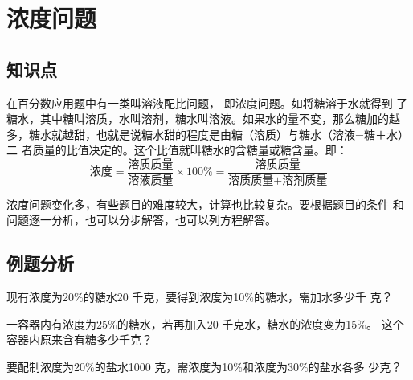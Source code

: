 \chapter{浓度问题}
\section{知识点}
在百分数应用题中有一类叫溶液配比问题， 即浓度问题。如将糖溶于水就得到
了糖水，其中糖叫溶质，水叫溶剂，糖水叫溶液。如果水的量不变，那么糖加的越
多，糖水就越甜，也就是说糖水甜的程度是由糖（溶质）与糖水（溶液=糖＋水）二
者质量的比值决定的。这个比值就叫糖水的含糖量或糖含量。即：
$$ \text{浓度}=\dfrac{\text{溶质质量}}{\text{溶液质量}}\times 100\%=\dfrac{\text{溶质质量}}{\text{溶质质量+溶剂质量}}$$\par
浓度问题变化多，有些题目的难度较大，计算也比较复杂。要根据题目的条件
和问题逐一分析，也可以分步解答，也可以列方程解答。
\section{例题分析}
\begin{example}
    现有浓度为20$\%$的糖水20 千克，要得到浓度为10$\%$的糖水，需加水多少千
    克？
\end{example}
\vspace{2cm}
\begin{example}
    一容器内有浓度为25$\%$的糖水，若再加入20 千克水，糖水的浓度变为15$\%$。
这个容器内原来含有糖多少千克？
\end{example}
\vspace{2cm}
\begin{example}要配制浓度为20$\%$的盐水1000 克，需浓度为10$\%$和浓度为30$\%$的盐水各多
少克？
\end{example}
\vspace{2cm}
\begin{exercise}
    
\end{exercise}
